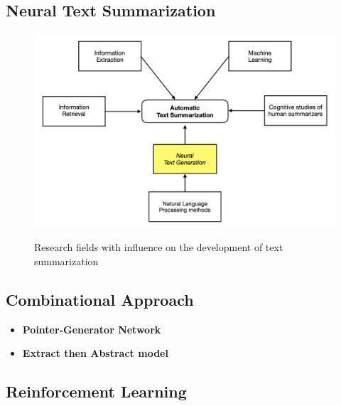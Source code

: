 \subsection{Neural Text Summarization}\label{ss:neuralgen}

\begin{figure}
	\begin{center}
		\includegraphics[width=5.5in]{photos/summ}\\
		\caption{Research fields with influence on the development of text summarization}\label{summ}
	\end{center}
\end{figure}

\subsection{Combinational Approach}

\begin{itemize}
	\item \textbf{Pointer-Generator Network}
	\item \textbf{Extract then Abstract model}
\end{itemize}

\subsection{Reinforcement Learning}
